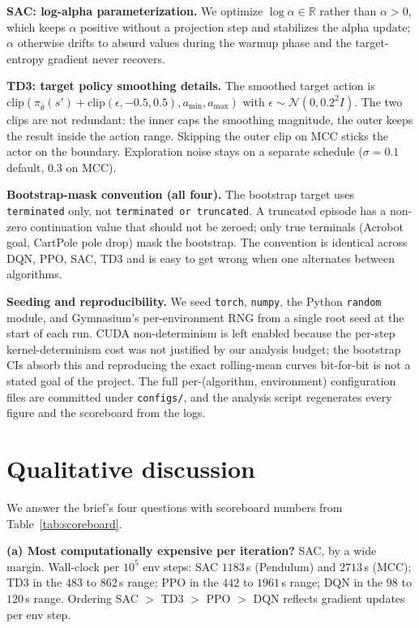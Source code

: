 \documentclass[10pt,a4paper]{article}
\begin{document}
\textbf{SAC: log-alpha parameterization.} We optimize $\log \alpha \in \mathbb{R}$ rather than $\alpha > 0$, which keeps $\alpha$ positive without a projection step and stabilizes the alpha update; $\alpha$ otherwise drifts to absurd values during the warmup phase and the target-entropy gradient never recovers.

\textbf{TD3: target policy smoothing details.} The smoothed target action is $\mathrm{clip}(\pi_{\bar{\theta}}(s') + \mathrm{clip}(\epsilon, -0.5, 0.5), a_{\min}, a_{\max})$ with $\epsilon \sim \mathcal{N}(0, 0.2^{2} I)$. The two clips are not redundant: the inner caps the smoothing magnitude, the outer keeps the result inside the action range. Skipping the outer clip on MCC sticks the actor on the boundary. Exploration noise stays on a separate schedule ($\sigma{=}0.1$ default, $0.3$ on MCC).

\textbf{Bootstrap-mask convention (all four).} The bootstrap target uses \texttt{terminated} only, not \texttt{terminated or truncated}. A truncated episode has a non-zero continuation value that should not be zeroed; only true terminals (Acrobot goal, CartPole pole drop) mask the bootstrap. The convention is identical across DQN, PPO, SAC, TD3 and is easy to get wrong when one alternates between algorithms.

\textbf{Seeding and reproducibility.} We seed \texttt{torch}, \texttt{numpy}, the Python \texttt{random} module, and Gymnasium's per-environment RNG from a single root seed at the start of each run. CUDA non-determinism is left enabled because the per-step kernel-determinism cost was not justified by our analysis budget; the bootstrap CIs absorb this and reproducing the exact rolling-mean curves bit-for-bit is not a stated goal of the project. The full per-(algorithm, environment) configuration files are committed under \texttt{configs/}, and the analysis script regenerates every figure and the scoreboard from the logs.


\section{Qualitative discussion}

We answer the brief's four questions with scoreboard numbers from Table~\ref{tab:scoreboard}.

\textbf{(a) Most computationally expensive per iteration?} SAC, by a wide margin. Wall-clock per $10^{5}$ env steps: SAC $1183$\,s (Pendulum) and $2713$\,s (MCC); TD3 in the $483$ to $862$\,s range; PPO in the $442$ to $1961$\,s range; DQN in the $98$ to $120$\,s range. Ordering SAC $>$ TD3 $>$ PPO $>$ DQN reflects gradient updates per env step.
\end{document}

